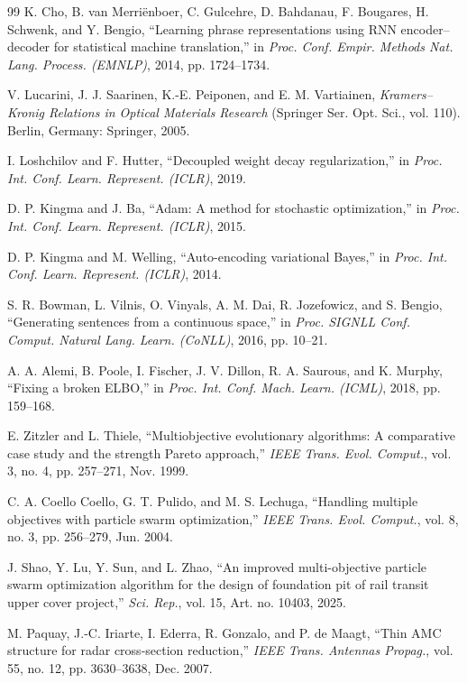 \documentclass[journal]{IEEEtran}
\begin{document}
\begin{thebibliography}{99}
 K. Cho, B. van Merri\"{e}nboer, C. Gulcehre, D. Bahdanau, F. Bougares, H. Schwenk, and Y. Bengio, ``Learning phrase representations using RNN encoder--decoder for statistical machine translation,'' in \textit{Proc. Conf. Empir. Methods Nat. Lang. Process. (EMNLP)}, 2014, pp. 1724--1734.

 V. Lucarini, J. J. Saarinen, K.-E. Peiponen, and E. M. Vartiainen, \textit{Kramers--Kronig Relations in Optical Materials Research} (Springer Ser. Opt. Sci., vol. 110). Berlin, Germany: Springer, 2005.

 I. Loshchilov and F. Hutter, ``Decoupled weight decay regularization,'' in \textit{Proc. Int. Conf. Learn. Represent. (ICLR)}, 2019.

 D. P. Kingma and J. Ba, ``Adam: A method for stochastic optimization,'' in \textit{Proc. Int. Conf. Learn. Represent. (ICLR)}, 2015.

 D. P. Kingma and M. Welling, ``Auto-encoding variational Bayes,'' in \textit{Proc. Int. Conf. Learn. Represent. (ICLR)}, 2014.

 S. R. Bowman, L. Vilnis, O. Vinyals, A. M. Dai, R. Jozefowicz, and S. Bengio, ``Generating sentences from a continuous space,'' in \textit{Proc. SIGNLL Conf. Comput. Natural Lang. Learn. (CoNLL)}, 2016, pp. 10--21.

 A. A. Alemi, B. Poole, I. Fischer, J. V. Dillon, R. A. Saurous, and K. Murphy, ``Fixing a broken ELBO,'' in \textit{Proc. Int. Conf. Mach. Learn. (ICML)}, 2018, pp. 159--168.

 E. Zitzler and L. Thiele, ``Multiobjective evolutionary algorithms: A comparative case study and the strength Pareto approach,'' \textit{IEEE Trans. Evol. Comput.}, vol. 3, no. 4, pp. 257--271, Nov. 1999.

 C. A. Coello Coello, G. T. Pulido, and M. S. Lechuga, ``Handling multiple objectives with particle swarm optimization,'' \textit{IEEE Trans. Evol. Comput.}, vol. 8, no. 3, pp. 256--279, Jun. 2004.

 J. Shao, Y. Lu, Y. Sun, and L. Zhao, ``An improved multi-objective particle swarm optimization algorithm for the design of foundation pit of rail transit upper cover project,'' \textit{Sci. Rep.}, vol. 15, Art. no. 10403, 2025.

 M. Paquay, J.-C. Iriarte, I. Ederra, R. Gonzalo, and P. de Maagt, ``Thin AMC structure for radar cross-section reduction,'' \textit{IEEE Trans. Antennas Propag.}, vol. 55, no. 12, pp. 3630--3638, Dec. 2007.


\end{thebibliography}
\end{document}
